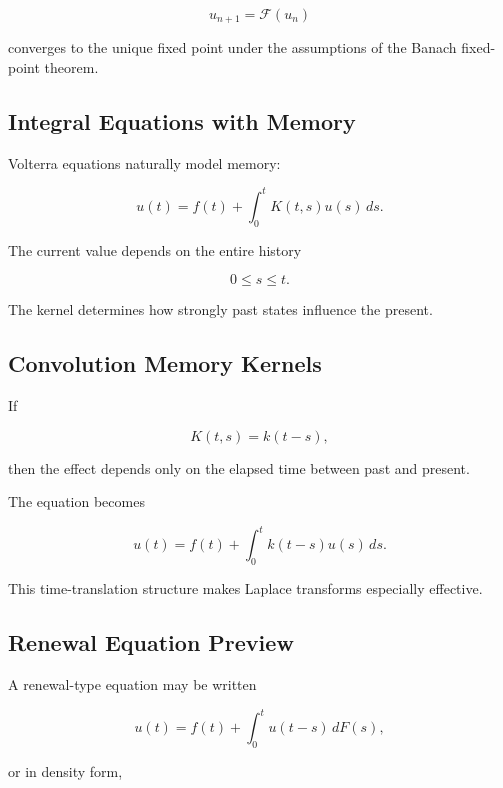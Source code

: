 \[
\boxed{
u_{n+1}
=
\mathcal{F}(u_n)
}
\]

converges to the unique fixed point under the assumptions of the Banach
fixed-point theorem.

\subsection{Integral Equations with Memory}
\label{subsec:integral-equations-memory}

Volterra equations naturally model memory:

\[
\boxed{
u(t)
=
f(t)
+
\int_0^t
K(t,s)u(s)\,ds.
}
\]

The current value depends on the entire history

\[
\boxed{
0\leq s\leq t.
}
\]

The kernel determines how strongly past states influence the present.

\subsection{Convolution Memory Kernels}
\label{subsec:convolution-memory-kernels}

If

\[
K(t,s)
=
k(t-s),
\]

then the effect depends only on the elapsed time between past and present.

The equation becomes

\[
\boxed{
u(t)
=
f(t)
+
\int_0^t
k(t-s)u(s)\,ds.
}
\]

This time-translation structure makes Laplace transforms especially
effective.

\subsection{Renewal Equation Preview}
\label{subsec:renewal-equation-preview}

A renewal-type equation may be written

\[
\boxed{
u(t)
=
f(t)
+
\int_0^t
u(t-s)\,dF(s),
}
\]

or in density form,

